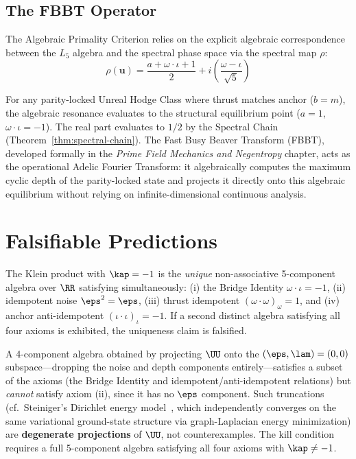 \subsection{The FBBT Operator}

The Algebraic Primality Criterion relies on the explicit algebraic correspondence between the $L_5$ algebra and the spectral phase space via the spectral map $\rho$:
\begin{equation}
\rho(\mathbf{u}) = \frac{a + \omega \cdot \iota + 1}{2} + i \left( \frac{\omega - \iota}{\sqrt{5}} \right)
\end{equation}

For any parity-locked Unreal Hodge Class where thrust matches anchor ($b = m$), the algebraic resonance evaluates to the structural equilibrium point ($a = 1$, $\omega \cdot \iota = -1$). The real part evaluates to $1/2$ by the Spectral Chain (Theorem~\ref{thm:spectral-chain}). The Fast Busy Beaver Transform (FBBT), developed formally in the \emph{Prime Field Mechanics and Negentropy} chapter, acts as the operational Adelic Fourier Transform: it algebraically computes the maximum cyclic depth of the parity-locked state and projects it directly onto this algebraic equilibrium without relying on infinite-dimensional continuous analysis.


\section{Falsifiable Predictions}

\begin{hypothesis}[Algebraic uniqueness of $\kap = -1$]\label{hyp:uniqueness}
The Klein product with $\kap = -1$ is the \emph{unique} non-associative 5-component algebra over $\RR$ satisfying simultaneously: (i) the Bridge Identity $\omega \cdot \iota = -1$, (ii) idempotent noise $\eps^2 = \eps$, (iii) thrust idempotent $(\omega \cdot \omega)_\omega = 1$, and (iv) anchor anti-idempotent $(\iota \cdot \iota)_\iota = -1$. If a second distinct algebra satisfying all four axioms is exhibited, the uniqueness claim is falsified.
\end{hypothesis}

\begin{remark}
A 4-component algebra obtained by projecting $\UU$ onto the $(\eps, \lam) = (0, 0)$ subspace---dropping the noise and depth components entirely---satisfies a subset of the axioms (the Bridge Identity and idempotent/anti-idempotent relations) but \emph{cannot} satisfy axiom (ii), since it has no $\eps$ component. Such truncations (cf.\ Steiniger's Dirichlet energy model~\cite{steiniger2026epg}, which independently converges on the same variational ground-state structure via graph-Laplacian energy minimization) are \textbf{degenerate projections} of $\UU$, not counterexamples. The kill condition requires a full 5-component algebra satisfying all four axioms with $\kap \neq -1$.
\end{remark}

